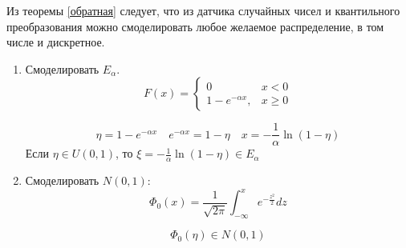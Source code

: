 Из теоремы \ref{обратная} следует, что из датчика случайных чисел и квантильного преобразования можно смоделировать любое желаемое распределение, в том числе и дискретное.

\begin{example}\itemfix
    \begin{enumerate}
        \item Смоделировать \(E_\alpha\).
              \[F(x) = \begin{cases}
                      0                     & x < 0    \\
                      1 - e^{ - \alpha x} , & x \geq 0
                  \end{cases}\]

            \[\eta = 1 - e^{ - \alpha x} \quad e^{ - \alpha x} = 1 - \eta \quad x =- \frac{1}{\alpha} \ln(1 - \eta)\]
            Если \(\eta \in U(0, 1)\), то \(\xi =- \frac{1}{\alpha} \ln(1 - \eta) \in E_\alpha\)
        \item Смоделировать \(N(0, 1)\):
                  \[\Phi_0(x) = \frac{1}{\sqrt{2\pi}} \int_{-\infty}^{x} e^{ - \frac{z^2}{2}} dz\]

                  \[\Phi_0(\eta) \in N(0, 1)\]
    \end{enumerate}
\end{example}
